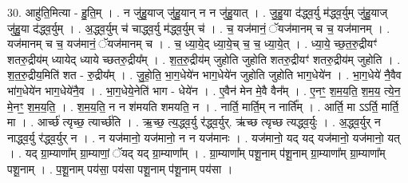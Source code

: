 \documentclass[17pt]{extarticle}
\begin{document}
30. आहु॑ति॒मित्या - हु॒ति॒म् । . न जु॑हु॒याज् जु॑हु॒यान् न न जु॑हु॒यात् । . जु॒हु॒या द॑द्ध्व॒र्यु म॑द्ध्व॒र्युम् जु॑हु॒याज् जु॑हु॒या द॑द्ध्व॒र्युम् । . अ॒द्ध्व॒र्युम् च॑ चाद्ध्व॒र्यु म॑द्ध्व॒र्युम् च॑ । . च॒ यज॑मानं॒ ॅयज॑मानम् च च॒ यज॑मानम् । . यज॑मानम् च च॒ यज॑मानं॒ ॅयज॑मानम् च । . च॒ ध्या॒ये॒द् ध्या॒ये॒च् च॒ च॒ ध्या॒ये॒त् । . ध्या॒ये॒ च्छ॒त॒रु॒द्रीयꣳ॑ शतरु॒द्रीय॑म् ध्यायेद् ध्याये च्छतरु॒द्रीय᳚म् । . श॒त॒रु॒द्रीय॑म् जुहोति जुहोति शतरु॒द्रीयꣳ॑ शतरु॒द्रीय॑म् जुहोति । . श॒त॒रु॒द्रीय॒मिति॑ शत - रु॒द्रीय᳚म् । . जु॒हो॒ति॒ भा॒ग॒धेये॑न भाग॒धेये॑न जुहोति जुहोति भाग॒धेये॑न । . भा॒ग॒धेये॑ नै॒वैव भा॑ग॒धेये॑न भाग॒धेये॑नै॒व । . भा॒ग॒धेये॒नेति॑ भाग - धेये॑न । . ए॒वैन॑ मेन मे॒वै वैन᳚म् । . ए॒नꣳ॒॒ श॒म॒य॒ति॒ श॒म॒य॒ त्ये॒न॒ मे॒नꣳ॒॒ श॒म॒य॒ति॒ । . श॒म॒य॒ति॒ न न श॑मयति शमयति॒ न । . नार्ति॒ मार्ति॒म् न नार्ति᳚म् । . आर्ति॒ मा ऽऽर्ति॒ मार्ति॒ मा । . आर्च्छ॑ त्यृच्छ॒ त्यार्च्छ॑ति । . ऋ॒च्छ॒ त्य॒द्ध्व॒र्यु र॑द्ध्व॒र्युर्. ऋ॑च्छ त्यृच्छ त्यद्ध्व॒र्युः । . अ॒द्ध्व॒र्युर् न नाद्ध्व॒र्यु र॑द्ध्व॒र्युर् न । . न यज॑मानो॒ यज॑मानो॒ न न यज॑मानः । . यज॑मानो॒ यद् यद् यज॑मानो॒ यज॑मानो॒ यत् । . यद् ग्रा॒म्याणा᳚म् ग्रा॒म्याणां॒ ॅयद् यद् ग्रा॒म्याणा᳚म् । . ग्रा॒म्याणा᳚म् पशू॒नाम् प॑शू॒नाम् ग्रा॒म्याणा᳚म् ग्रा॒म्याणा᳚म् पशू॒नाम् । . प॒शू॒नाम् पय॑सा॒ पय॑सा पशू॒नाम् प॑शू॒नाम् पय॑सा । \newline
\end{document}
